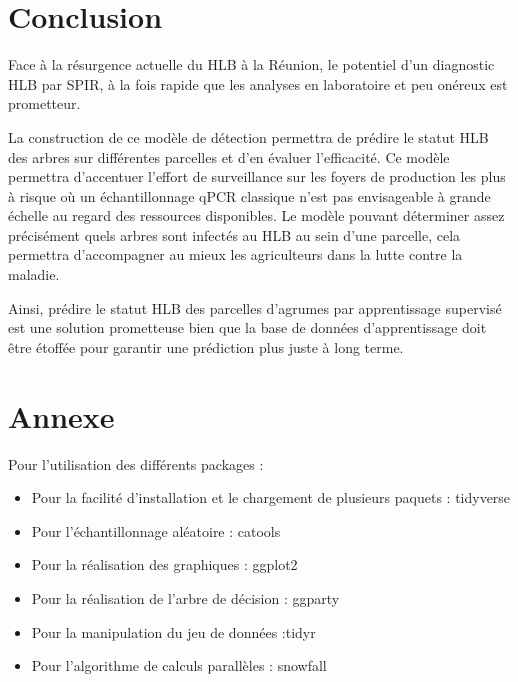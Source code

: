 \documentclass[
  11pt,
  french,
  a4paper,
  extrafontsizes,onecolumn,openright
  ]{memoir}
\providecommand{\tightlist}{%
  \setlength{\itemsep}{0pt}\setlength{\parskip}{0pt}}
\begin{document}
\hypertarget{conclusion}{%
\chapter{Conclusion}\label{conclusion}}

Face à la résurgence actuelle du HLB à la Réunion, le potentiel d'un diagnostic HLB par SPIR, à la fois rapide que les analyses en laboratoire et peu onéreux est prometteur.

La construction de ce modèle de détection permettra de prédire le statut HLB des arbres sur différentes parcelles et d'en évaluer l'efficacité. Ce modèle permettra d'accentuer l'effort de surveillance sur les foyers de production les plus à risque où un échantillonnage qPCR classique n'est pas envisageable à grande échelle au regard des ressources disponibles.
Le modèle pouvant déterminer assez précisément quels arbres sont infectés au HLB au sein d'une parcelle, cela permettra d'accompagner au mieux les agriculteurs dans la lutte contre la maladie.

Ainsi, prédire le statut HLB des parcelles d'agrumes par apprentissage supervisé est une solution prometteuse bien que la base de données d'apprentissage doit être étoffée pour garantir une prédiction plus juste à long terme.

\hypertarget{annexe}{%
\chapter{Annexe}\label{annexe}}

Pour l'utilisation des différents packages :

\begin{itemize}
\tightlist
\item
  Pour la facilité d'installation et le chargement de plusieurs paquets : tidyverse \autocite{tidyverse}
\item
  Pour l'échantillonnage aléatoire : catools \autocite{caTools}
\item
  Pour la réalisation des graphiques : ggplot2 \autocite{ggplot2}
\item
  Pour la réalisation de l'arbre de décision : ggparty \autocite{ggparty}
\item
  Pour la manipulation du jeu de données :tidyr \autocite{tidyr}
\item
  Pour l'algorithme de calculs parallèles : snowfall \autocite{snowfall}
\end{itemize}

\scriptsize
\end{document}
